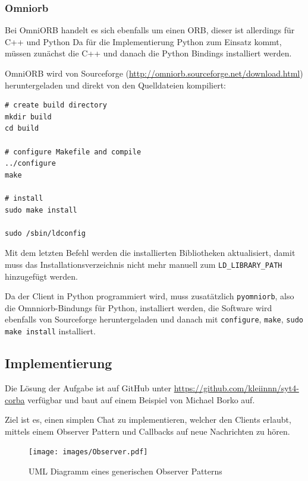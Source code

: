 \subsubsection{Omniorb}
Bei OmniORB handelt es sich ebenfalls um einen ORB, dieser ist allerdings f\"ur C++ und Python
Da f\"ur die Implementierung Python zum Einsatz kommt, m\"ussen zun\"achst die C++ und danach die Python Bindings installiert werden.

OmniORB wird von Sourceforge (\url{http://omniorb.sourceforge.net/download.html}) heruntergeladen und direkt von den Quelldateien kompiliert:
\begin{lstlisting}[caption=Installation von OmniORB]
# create build directory
mkdir build
cd build

# configure Makefile and compile
../configure
make

# install
sudo make install

sudo /sbin/ldconfig
\end{lstlisting}

Mit dem letzten Befehl werden die installierten Bibliotheken aktualisiert, damit muss das Installationsverzeichnis nicht mehr manuell zum \texttt{LD\_LIBRARY\_PATH} hinzugef\"ugt werden.

Da der Client in Python programmiert wird, muss zusat\"atzlich \texttt{pyomniorb}, also die Omnniorb-Bindungs f\"ur Python, installiert werden, die Software wird ebenfalls von Sourceforge heruntergeladen und danach mit \texttt{configure}, \texttt{make}, \texttt{sudo make install} installiert.

\subsection{Implementierung}
Die L\"osung der Aufgabe ist auf GitHub unter \url{https://github.com/kleiinnn/syt4-corba} verf\"ugbar und baut auf einem Beispiel von Michael Borko\cite{example} auf.

Ziel ist es, einen simplen Chat zu implementieren, welcher den Clients erlaubt, mittels einem Observer Pattern und Callbacks auf neue Nachrichten zu h\"oren.

\begin{figure}[H]
	\begin{center}
		\texttt{[image: images/Observer.pdf]}
		\caption{UML Diagramm eines generischen Observer Patterns\cite{observer-pattern}}
		\label{broker}
	\end{center}
\end{figure}

